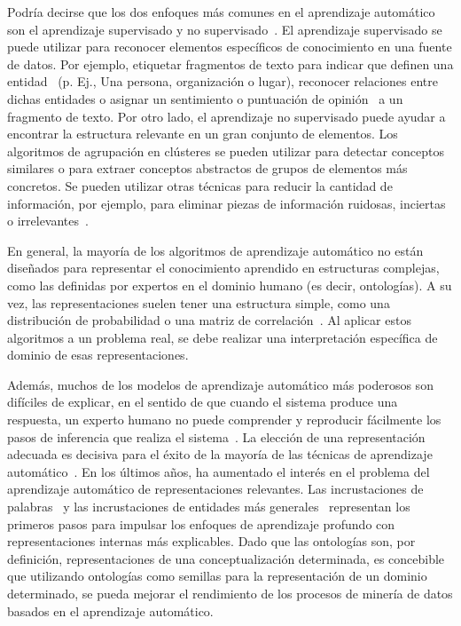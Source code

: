 Podría decirse que los dos enfoques más comunes en el aprendizaje automático son el aprendizaje supervisado y no supervisado~\cite{kevin2012machine}. El aprendizaje supervisado se puede utilizar para reconocer elementos específicos de conocimiento en una fuente de datos. Por ejemplo, etiquetar fragmentos de texto para indicar que definen una entidad~\cite{nadeau2007survey} (p. Ej., Una persona, organización o lugar), reconocer relaciones entre dichas entidades o asignar un sentimiento o puntuación de opinión~\cite{liu2012sentiment} a un fragmento de texto. Por otro lado, el aprendizaje no supervisado puede ayudar a encontrar la estructura relevante en un gran conjunto de elementos. Los algoritmos de agrupación en clústeres se pueden utilizar para detectar conceptos similares o para extraer conceptos abstractos de grupos de elementos más concretos. Se pueden utilizar otras técnicas para reducir la cantidad de información, por ejemplo, para eliminar piezas de información ruidosas, inciertas o irrelevantes~\cite{bingham2001random}.

En general, la mayoría de los algoritmos de aprendizaje automático no están diseñados para representar el conocimiento aprendido en estructuras complejas, como las definidas por expertos en el dominio humano (es decir, ontologías). A su vez, las representaciones suelen tener una estructura simple, como una distribución de probabilidad o una matriz de correlación~\cite{bengio2013representation}. Al aplicar estos algoritmos a un problema real, se debe realizar una interpretación específica de dominio de esas representaciones.

Además, muchos de los modelos de aprendizaje automático más poderosos son difíciles de explicar, en el sentido de que cuando el sistema produce una respuesta, un experto humano no puede comprender y reproducir fácilmente los pasos de inferencia que realiza el sistema~\cite{olden2002illuminating}. La elección de una representación adecuada es decisiva para el éxito de la mayoría de las técnicas de aprendizaje automático~\cite{bengio2012deep}. En los últimos años, ha aumentado el interés en el problema del aprendizaje automático de representaciones relevantes. Las incrustaciones de palabras~\cite{mikolov} y las incrustaciones de entidades más generales~\cite{hu2015entity} representan los primeros pasos para impulsar los enfoques de aprendizaje profundo con representaciones internas más explicables. Dado que las ontologías son, por definición, representaciones de una conceptualización determinada, es concebible que utilizando ontologías como semillas para la representación de un dominio determinado, se pueda mejorar el rendimiento de los procesos de minería de datos basados en el aprendizaje automático.

